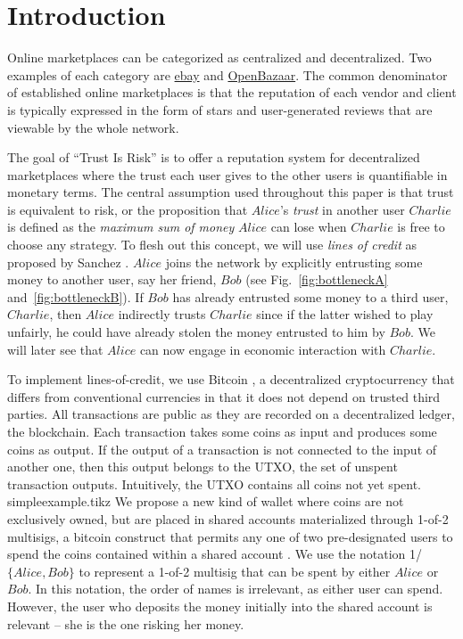 \section{Introduction}
  Online marketplaces can be categorized as centralized and decentralized.
  Two examples of each category are \href{http://www.ebay.com}{ebay} and \href{https://openbazaar.org/}{OpenBazaar}.
  The common denominator of established online marketplaces is that the reputation of each vendor and client is typically
  expressed in the form of stars and user-generated reviews that are viewable by the whole network.

  The goal of ``Trust Is Risk'' is to offer a reputation system for decentralized marketplaces where the trust each user gives
  to the other users is quantifiable in monetary terms. The central assumption used throughout this paper is that trust is
  equivalent to risk, or the proposition that $Alice$'s \textit{trust} in another user $Charlie$ is defined as the
  \textit{maximum sum of money} $Alice$ can lose when $Charlie$ is free to choose any strategy. To flesh out this concept, we
  will use \textit{lines of credit} as proposed by Sanchez \cite{loc}. $Alice$ joins the network by explicitly entrusting some
  money to another user, say her friend, $Bob$ (see Fig.~\ref{fig:bottleneckA} and~\ref{fig:bottleneckB}). If $Bob$ has
  already entrusted some money to a third user, $Charlie$, then $Alice$ indirectly trusts $Charlie$ since if the latter wished
  to play unfairly, he could have already stolen the money entrusted to him by $Bob$. We will later see that $Alice$ can now
  engage in economic interaction with $Charlie$.

  To implement lines-of-credit, we use Bitcoin \cite{bitcoin}, a decentralized cryptocurrency that differs from conventional
  currencies in that it does not depend on trusted third parties. All transactions are public as they are recorded on a
  decentralized ledger, the blockchain. Each transaction takes some coins as input and produces some coins as output. If the
  output of a transaction is not connected to the input of another one, then this output belongs to the UTXO, the set of
  unspent transaction outputs. Intuitively, the UTXO contains all coins not yet spent.
  \medskip \ \\
  {simpleexample.tikz}
  \noindent We propose a new kind of wallet where coins are not exclusively owned, but are placed in shared accounts materialized
  through 1-of-2 multisigs, a bitcoin construct that permits any one of two pre-designated users to spend the coins contained
  within a shared account \cite{masteringbitcoin}. We use the notation 1/$\{Alice, Bob\}$ to represent a 1-of-2 multisig that
  can be spent by either $Alice$ or $Bob$. In this notation, the order of names is irrelevant, as either user can spend.
  However, the user who deposits the money initially into the shared account is relevant -- she is the one risking her money.

